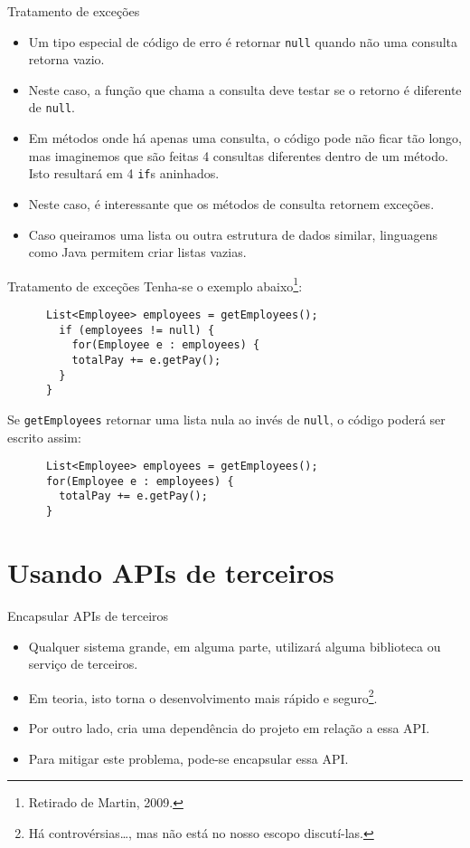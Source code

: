 \documentclass[11pt]{beamer}
\begin{document}
  \begin{frame}[fragile]{Tratamento de exceções}
    \begin{itemize}
      \item Um tipo especial de código de erro é retornar \verb|null| quando não uma consulta retorna vazio.
      \item Neste caso, a função que chama a consulta deve testar se o retorno é diferente de \verb|null|.
      \item Em métodos onde há apenas uma consulta, o código pode não ficar tão longo, mas imaginemos que são feitas 4 consultas diferentes dentro de um método. Isto resultará em 4 \verb|if|s aninhados.
      \item Neste caso, é interessante que os métodos de consulta retornem exceções.
      \item Caso queiramos uma lista ou outra estrutura de dados similar, linguagens como Java permitem criar listas vazias. 
    \end{itemize}
  \end{frame}

  \begin{frame}[fragile]{Tratamento de exceções}
    Tenha-se o exemplo abaixo\footnote{Retirado de Martin, 2009.}:
    \begin{lstlisting}
      List<Employee> employees = getEmployees();
        if (employees != null) {
          for(Employee e : employees) {
          totalPay += e.getPay();
        }
      }
    \end{lstlisting}
    Se \verb|getEmployees| retornar uma lista nula ao invés de \verb|null|, o código poderá ser escrito assim:
    \begin{lstlisting}
      List<Employee> employees = getEmployees();
      for(Employee e : employees) {
        totalPay += e.getPay();
      }
    \end{lstlisting}
  \end{frame}

  \section{Usando APIs de terceiros}

  \begin{frame}{Encapsular APIs de terceiros}
    \begin{itemize}
      \item Qualquer sistema grande, em alguma parte, utilizará alguma biblioteca ou serviço de terceiros.
      \item Em teoria, isto torna o desenvolvimento mais rápido e seguro\footnote{Há controvérsias\dots, mas não está no nosso escopo discutí-las.}.
      \item Por outro lado, cria uma dependência do projeto em relação a essa API.
      \item Para mitigar este problema, pode-se encapsular essa API.
    \end{itemize}
  \end{frame}
\end{document}
